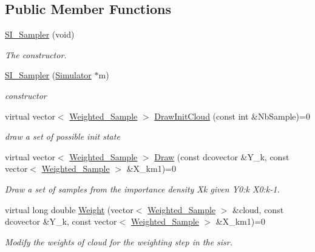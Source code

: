 \subsection*{Public Member Functions}
\begin{CompactItemize}
\item 
\hyperlink{class_s_i___sampler_34229c2cf9f69118ef54233deaed943e}{SI\_\-Sampler} (void)
\begin{CompactList}\small\item\em The constructor. \item\end{CompactList}\item 
\hyperlink{class_s_i___sampler_3d6f1ddcca06c4e086b4af48e0b68645}{SI\_\-Sampler} (\hyperlink{class_simulator}{Simulator} $\ast$m)
\begin{CompactList}\small\item\em constructor \item\end{CompactList}\item 
virtual vector$<$ \hyperlink{class_weighted___sample}{Weighted\_\-Sample} $>$ \hyperlink{class_s_i___sampler_3fbedf1ce189168da5608861d5a3289e}{DrawInitCloud} (const int \&NbSample)=0
\begin{CompactList}\small\item\em draw a set of possible init state \item\end{CompactList}\item 
virtual vector$<$ \hyperlink{class_weighted___sample}{Weighted\_\-Sample} $>$ \hyperlink{class_s_i___sampler_62bf57181aeb5981426a71a7bf01c3e9}{Draw} (const dcovector \&Y\_\-k, const vector$<$ \hyperlink{class_weighted___sample}{Weighted\_\-Sample} $>$ \&X\_\-km1)=0
\begin{CompactList}\small\item\em Draw a set of samples from the importance density Xk given Y0:k X0:k-1. \item\end{CompactList}\item 
virtual long double \hyperlink{class_s_i___sampler_5c3a3547060d91febd3ef61969756ab6}{Weight} (vector$<$ \hyperlink{class_weighted___sample}{Weighted\_\-Sample} $>$ \&cloud, const dcovector \&Y\_\-k, const vector$<$ \hyperlink{class_weighted___sample}{Weighted\_\-Sample} $>$ \&X\_\-km1)=0
\begin{CompactList}\small\item\em Modify the weights of cloud for the weighting step in the sisr. \item\end{CompactList}\end{CompactItemize}
